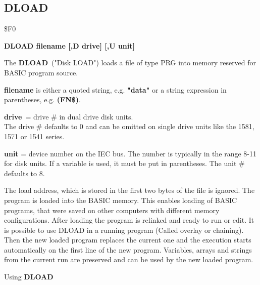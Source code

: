 \subsection{DLOAD}
\begin{description}[leftmargin=3cm,style=nextline]
\item [Token:] \$F0
\item [Format:] {\bf DLOAD filename [,D drive] [,U unit] }
\item [Usage:]
   The {\bf DLOAD} ("Disk LOAD") loads a file of type
   PRG into memory reserved for BASIC program source.

   {\bf filename} is either a quoted string, e.g. {\bf "data"} or
   a string expression in parentheses, e.g. {\bf (FN\$)}.

   {\bf drive} = drive \# in dual drive disk units. \\
   The drive \# defaults to 0 and can be omitted on single drive units
   like the 1581, 1571 or 1541 series.

   {\bf unit} = device number on the IEC bus.
   The number is typically in the range 8-11 for disk units.
   If a variable is used, it must be put in parentheses.
   The unit \# defaults to 8.

\item [Remarks:]
   The load address, which is stored in the first two bytes
   of the file is ignored. The program is loaded into
   the BASIC memory. This enables loading of BASIC programs,
   that were saved on other computers with different memory
   configurations. After loading the program is relinked
   and ready to run or edit.
   It is possible to use DLOAD in a running program
   (Called overlay or chaining).
   Then the new loaded program replaces the current one
   and the execution starts automatically on the first line of the
   new program. Variables, arrays and strings from the current
   run are preserved and can be used by the new loaded program.

\item [Example:] Using {\bf DLOAD}
\end{description}


\newpage
